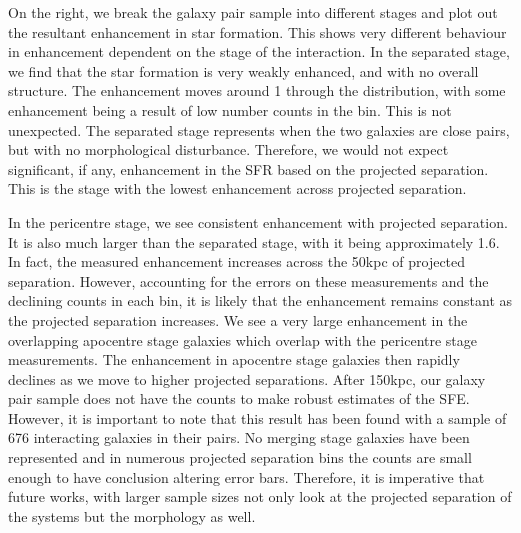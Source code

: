 On the right, we break the galaxy pair sample into different stages and plot out the resultant enhancement in star formation. This shows very different behaviour in enhancement dependent on the stage of the interaction. In the separated stage, we find that the star formation is very weakly enhanced, and with no overall structure. The enhancement moves around 1 through the distribution, with some enhancement being a result of low number counts in the bin. This is not unexpected. The separated stage represents when the two galaxies are close pairs, but with no morphological disturbance. Therefore, we would not expect significant, if any, enhancement in the SFR based on the projected separation. This is the stage with the lowest enhancement across projected separation.

In the pericentre stage, we see consistent enhancement with projected separation. It is also much larger than the separated stage, with it being approximately 1.6. In fact, the measured enhancement increases across the 50kpc of projected separation. However, accounting for the errors on these measurements and the declining counts in each bin, it is likely that the enhancement remains constant as the projected separation increases. We see a very large enhancement in the overlapping apocentre stage galaxies which overlap with the pericentre stage measurements. The enhancement in apocentre stage galaxies then rapidly declines as we move to higher projected separations. After 150kpc, our galaxy pair sample does not have the counts to make robust estimates of the SFE. However, it is important to note that this result has been found with a sample of 676 interacting galaxies in their pairs. No merging stage galaxies have been represented and in numerous projected separation bins the counts are small enough to have conclusion altering error bars. Therefore, it is imperative that future works, with larger sample sizes not only look at the projected separation of the systems but the morphology as well.

